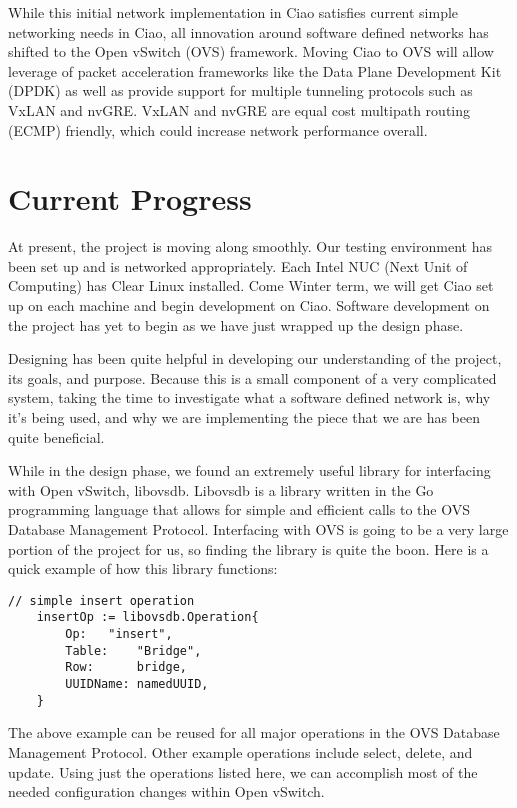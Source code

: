 \documentclass[10pt,onecolumn,journal,draftclsnofoot]{IEEEtran}
\begin{document}
While this initial network implementation in Ciao satisfies current simple
networking needs in Ciao, all innovation around software defined networks has
shifted to the Open vSwitch (OVS) framework. Moving Ciao to OVS will allow
leverage of packet acceleration frameworks like the Data Plane Development Kit
(DPDK) as well as provide support for multiple tunneling protocols such as VxLAN
and nvGRE. VxLAN and nvGRE are equal cost multipath routing (ECMP) friendly,
which could increase network performance overall.

\section{Current Progress}
At present, the project is moving along smoothly. Our testing environment has
been set up and is networked appropriately. Each Intel NUC (Next Unit of
Computing) has Clear Linux installed. Come Winter term, we will get Ciao set up
on each machine and begin development on Ciao. Software development on the
project has yet to begin as we have just wrapped up the design phase.

Designing has been quite helpful in developing our understanding of the project,
its goals, and purpose. Because this is a small component of a very complicated
system, taking the time to investigate what a software defined network is, why
it's being used, and why we are implementing the piece that we are has been
quite beneficial.

While in the design phase, we found an extremely useful library for interfacing
with Open vSwitch, libovsdb. Libovsdb is a library written in the Go programming
language that allows for simple and efficient calls to the OVS Database
Management Protocol. Interfacing with OVS is going to be a very large
portion of the project for us, so finding the library is quite the boon. Here
is a quick example of how this library functions:\\

\begin{lstlisting}[caption=Example insert operation using libovsdb]
	// simple insert operation
	insertOp := libovsdb.Operation{
		Op:	  "insert",
		Table:	  "Bridge",
		Row:	  bridge,
		UUIDName: namedUUID,
	}
\end{lstlisting}

The above example can be reused for all major operations in the OVS Database
Management Protocol. Other example operations include select, delete, and
update. Using just the operations listed here, we can accomplish most of the
needed configuration changes within Open vSwitch.
\end{document}
